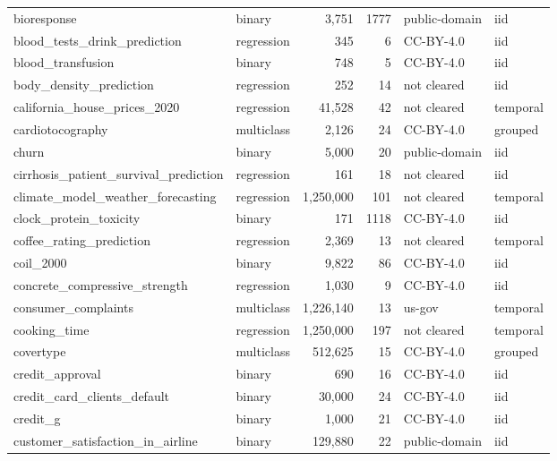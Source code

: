\begin{longtable}{>{\raggedright\arraybackslash}p{5.5cm}lrrll}
bioresponse & binary & 3,751 & 1777 & public-domain & iid\\
blood\_\allowbreak{}tests\_\allowbreak{}drink\_\allowbreak{}prediction & regression & 345 & 6 & CC-BY-4.0 & iid\\
blood\_\allowbreak{}transfusion & binary & 748 & 5 & CC-BY-4.0 & iid\\
body\_\allowbreak{}density\_\allowbreak{}prediction & regression & 252 & 14 & not cleared & iid\\
california\_\allowbreak{}house\_\allowbreak{}prices\_\allowbreak{}2020 & regression & 41,528 & 42 & not cleared & temporal\\
cardiotocography & multiclass & 2,126 & 24 & CC-BY-4.0 & grouped\\
churn & binary & 5,000 & 20 & public-domain & iid\\
cirrhosis\_\allowbreak{}patient\_\allowbreak{}survival\_\allowbreak{}prediction & regression & 161 & 18 & not cleared & iid\\
climate\_\allowbreak{}model\_\allowbreak{}weather\_\allowbreak{}forecasting & regression & 1,250,000 & 101 & not cleared & temporal\\
clock\_\allowbreak{}protein\_\allowbreak{}toxicity & binary & 171 & 1118 & CC-BY-4.0 & iid\\
coffee\_\allowbreak{}rating\_\allowbreak{}prediction & regression & 2,369 & 13 & not cleared & temporal\\
coil\_\allowbreak{}2000 & binary & 9,822 & 86 & CC-BY-4.0 & iid\\
concrete\_\allowbreak{}compressive\_\allowbreak{}strength & regression & 1,030 & 9 & CC-BY-4.0 & iid\\
consumer\_\allowbreak{}complaints & multiclass & 1,226,140 & 13 & us-gov & temporal\\
cooking\_\allowbreak{}time & regression & 1,250,000 & 197 & not cleared & temporal\\
covertype & multiclass & 512,625 & 15 & CC-BY-4.0 & grouped\\
credit\_\allowbreak{}approval & binary & 690 & 16 & CC-BY-4.0 & iid\\
credit\_\allowbreak{}card\_\allowbreak{}clients\_\allowbreak{}default & binary & 30,000 & 24 & CC-BY-4.0 & iid\\
credit\_\allowbreak{}g & binary & 1,000 & 21 & CC-BY-4.0 & iid\\
customer\_\allowbreak{}satisfaction\_\allowbreak{}in\_\allowbreak{}airline & binary & 129,880 & 22 & public-domain & iid\\

\end{longtable}
